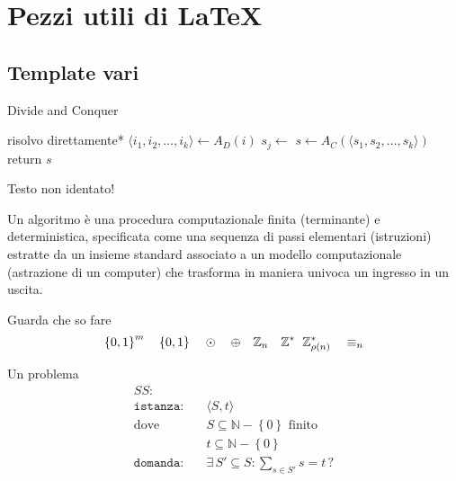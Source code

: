 \section{Pezzi utili di \LaTeX{}}

\subsection{Template vari}

\begin{algorithm}[H]
\caption{Divide and Conquer}\label{alg:dnc}
\begin{algorithmic}[1]
            \State *risolvo direttamente*
        \EndIf
        \State $\langle i_1, i_2, \dots, i_k \rangle \gets A_D(i)$ 
            \State $s_j \gets $
        \EndFor
        \State $s \gets A_C(\langle s_1, s_2, \dots, s_k \rangle)$
        \State return $s$
    \EndProcedure
\end{algorithmic}
\end{algorithm}
\noindent
Testo non identato!

\begin{definition}[Algoritmo]\label{def:algex}
    Un algoritmo è una procedura computazionale finita (terminante) e deterministica, specificata come una sequenza di passi elementari (istruzioni) estratte da un insieme standard associato a un modello computazionale (astrazione di un computer) che trasforma in maniera univoca un ingresso in un uscita.
\end{definition}

Guarda che so fare
\begin{equation*}
    \left\{0,1\right\}^{m}
    \quad
    \left\{0,1\right\}^{}
    \quad
    \odot
    \quad
    \oplus
    \quad
    \mathbb{Z}_{n}
    \quad
    \mathbb{Z}_{\quad}^{*}
    \mathbb{Z}_{\rho(n)}^{*}
    \quad
    \equiv_n
\end{equation*}

Un problema
\begin{align*}
    SS: & \\
    \texttt{istanza:} \quad &
    \langle
        S,t
    \rangle
    \\
    \text{dove} \quad &
    S \subseteq \mathbb{N} - \left\{ 0 \right\} \text{ finito}
    \\
    &
    t \subseteq \mathbb{N} - \left\{ 0 \right\} \\
    \texttt{domanda:} \quad &
    \exists \, S' \subseteq S : \sum_{s \in S'}^{} s = t \, ?
\end{align*}

